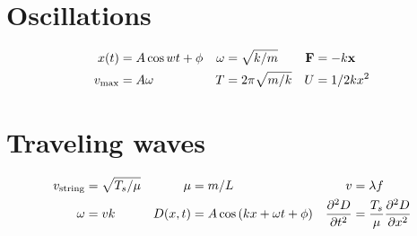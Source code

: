 \documentclass[10pt]{article}
\begin{document}
\section{Oscillations}

\begin{align*}
x(t) &= A\cos{wt+\phi}
&
\omega &= \sqrt{k/m}
&
\vb{F} &= -k\vb{x}
\\
v_{\text{max}} &= A\omega
&
T &= 2\pi \sqrt{m/k}
&
U &= 1/2kx^2
\end{align*}


\section{Traveling waves}

\begin{align*}
v_{\text{string}} &= \sqrt{T_s/\mu}
&
\mu &= m/L
&
v &= \lambda f
\\
\omega &= vk
&
D(x,t) &= A\cos{(kx + \omega t +\phi)}
&
\pdv[2]{D}{t} &= \frac{T_s}{\mu}\pdv[2]{D}{x}
\end{align*}
\end{document}
